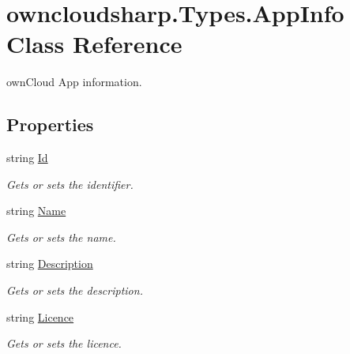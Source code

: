 \hypertarget{classowncloudsharp_1_1_types_1_1_app_info}{}\section{owncloudsharp.\+Types.\+App\+Info Class Reference}
\label{classowncloudsharp_1_1_types_1_1_app_info}


own\+Cloud App information.  


\subsection*{Properties}
\begin{DoxyCompactItemize}
\item 
string \hyperlink{classowncloudsharp_1_1_types_1_1_app_info_ac12addd408514cce9faac8898bb70b70}{Id}
\begin{DoxyCompactList}\small\item\em Gets or sets the identifier. \end{DoxyCompactList}\item 
string \hyperlink{classowncloudsharp_1_1_types_1_1_app_info_a602c67891b544018cb2357ea16e55071}{Name}
\begin{DoxyCompactList}\small\item\em Gets or sets the name. \end{DoxyCompactList}\item 
string \hyperlink{classowncloudsharp_1_1_types_1_1_app_info_a3fe8c924b76d206ea155ff7df8afa08b}{Description}
\begin{DoxyCompactList}\small\item\em Gets or sets the description. \end{DoxyCompactList}\item 
string \hyperlink{classowncloudsharp_1_1_types_1_1_app_info_ac7d38d4752320cee01dbae72f27dcc0c}{Licence}
\begin{DoxyCompactList}\small\item\em Gets or sets the licence. \end{DoxyCompactList}\item 

\end{DoxyCompactItemize}
